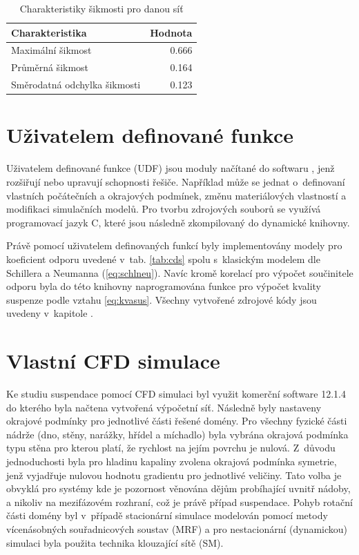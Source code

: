 \begin{table}[h!]
\centering
\caption{Charakteristiky šikmosti pro danou síť}
\label{tab:skw_tab}
\begin{tabular}{lr}
\toprule
\textbf{Charakteristika} & \textbf{Hodnota} \\
\midrule

Maximální šikmost & \num{0.666} \\
Průměrná šikmost & \num{0.164} \\
Směrodatná odchylka šikmosti & \num{0.123} \\

\bottomrule
\end{tabular}
\end{table}

\section{Uživatelem definované funkce}
Uživatelem definované funkce (UDF) jsou moduly načítané do softwaru \flu, jenž rozšiřují nebo upravují schopnosti řešiče. Například může se jednat o~definovaní vlastních počátečních a okrajových podmínek, změnu materiálových vlastností a modifikaci simulačních modelů. Pro tvorbu zdrojových souborů se využívá programovací jazyk C, které jsou následně zkompilovaný do dynamické knihovny.

Právě pomocí uživatelem definovaných funkcí byly implementovány modely pro koeficient odporu uvedené v~tab. \ref{tab:cds} spolu s~klasickým modelem dle Schillera a Neumanna (\ref{eq:schlneu}). Navíc kromě korelací pro výpočet součinitele odporu byla do této knihovny naprogramována funkce pro výpočet kvality suspenze podle vztahu \ref{eq:kvasus}. Všechny vytvořené zdrojové kódy jsou uvedeny v~kapitole .

\section{Vlastní CFD simulace}
Ke studiu suspendace pomocí CFD simulaci byl využit komerční software \flu{} 12.1.4 do kterého byla načtena vytvořená výpočetní síť. Následně byly nastaveny okrajové podmínky pro jednotlivé části řešené domény. Pro všechny fyzické části nádrže (dno, stěny, narážky, hřídel a míchadlo) byla vybrána okrajová podmínka typu stěna pro kterou platí, že rychlost na jejím povrchu je nulová. Z~důvodu jednoduchosti byla pro hladinu kapaliny zvolena okrajová podmínka symetrie, jenž vyjadřuje nulovou hodnotu gradientu pro jednotlivé veličiny. Tato volba je obvyklá pro systémy kde je pozornost věnována dějům probíhající uvnitř nádoby, a nikoliv na mezifázovém rozhraní, což je právě případ suspendace. Pohyb rotační části domény byl v~případě stacionární simulace modelován pomocí metody vícenásobných souřadnicových soustav (MRF) a pro nestacionární (dynamickou) simulaci byla použita technika klouzající sítě (SM). 

